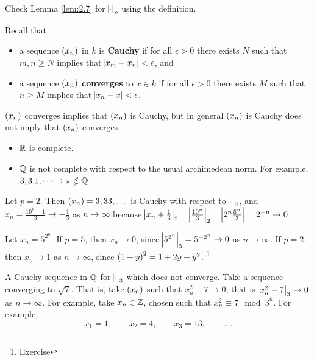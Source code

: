 \begin{exercise}
Check Lemma \ref{lem:2.7} for $ \abs{\cdot}_p $ using the definition.
\end{exercise}

\pagebreak

Recall that
\begin{itemize}
\item a sequence $ \br{x_n} $ in $ k $ is \textbf{Cauchy} if for all $ \epsilon > 0 $ there exists $ N $ such that $ m, n \ge N $ implies that $ \abs{x_m - x_n} < \epsilon $, and
\item a sequence $ \br{x_n} $ \textbf{converges} to $ x \in k $ if for all $ \epsilon > 0 $ there exists $ M $ such that $ n \ge M $ implies that $ \abs{x_n - x} < \epsilon $.
\end{itemize}
$ \br{x_n} $ converges implies that $ \br{x_n} $ is Cauchy, but in general $ \br{x_n} $ is Cauchy does not imply that $ \br{x_n} $ converges.

\begin{example*}
\hfill
\begin{itemize}
\item $ \mathbb{R} $ is complete.
\item $ \mathbb{Q} $ is not complete with respect to the usual archimedean norm. For example, $ 3, 3.1, \dots \to \pi \notin \mathbb{Q} $.
\end{itemize}
\end{example*}

\begin{example}
Let $ p = 2 $. Then $ \br{x_n} = 3, 33, \dots $ is Cauchy with respect to $ \abs{\cdot}_2 $, and $ x_n = \tfrac{10^n - 1}{3} \to -\tfrac{1}{3} $ as $ n \to \infty $ because $ \abs{x_n + \tfrac{1}{3}}_2 = \abs{\tfrac{10^n}{3}}_2 = \abs{2^n\tfrac{5^n}{3}} = 2^{-n} \to 0 $.
\end{example}

\begin{example}
Let $ x_n = 5^{2^n} $. If $ p = 5 $, then $ x_n \to 0 $, since $ \abs{5^{2^n}}_5 = 5^{-2^n} \to 0 $ as $ n \to \infty $. If $ p = 2 $, then $ x_n \to 1 $ as $ n \to \infty $, since $ \br{1 + y}^2 = 1 + 2y + y^2 $. \footnote{Exercise}
\end{example}

\begin{example*}
A Cauchy sequence in $ \mathbb{Q} $ for $ \abs{\cdot}_3 $ which does not converge. Take a sequence converging to $ \sqrt{7} $. That is, take $ \br{x_n} $ such that $ x_n^2 - 7 \to 0 $, that is $ \abs{x_n^2 - 7}_3 \to 0 $ as $ n \to \infty $. For example, take $ x_n \in \mathbb{Z} $, chosen such that $ x_n^2 \equiv 7 \mod 3^n $. For example,
$$ x_1 = 1, \qquad x_2 = 4, \qquad x_3 = 13, \qquad \dots. $$
\end{example*}

